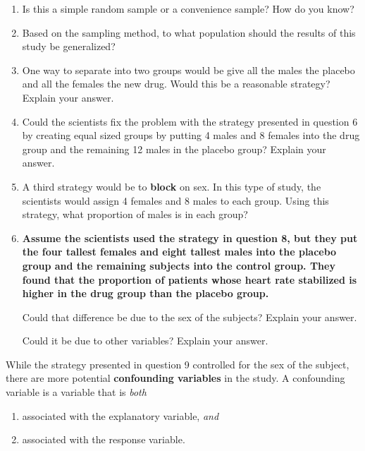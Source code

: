 \documentclass[
]{report}
\providecommand{\tightlist}{%
  \setlength{\itemsep}{0pt}\setlength{\parskip}{0pt}}
\begin{document}
\begin{enumerate}
\def\labelenumi{\arabic{enumi}.}
\setcounter{enumi}{3}
\item
  Is this a simple random sample or a convenience sample? How do you know?
  \vspace{0.5in}
\item
  Based on the sampling method, to what population should the results of this study be generalized?
  \vspace{0.5in}
\item
  One way to separate into two groups would be give all the males the placebo and all the females the new drug. Would this be a reasonable strategy? Explain your answer.
  \vspace{1in}
\item
  Could the scientists fix the problem with the strategy presented in question 6 by creating equal sized groups by putting 4 males and 8 females into the drug group and the remaining 12 males in the placebo group? Explain your answer.
  \vspace{0.5in}
\item
  A third strategy would be to \textbf{block} on sex. In this type of study, the scientists would assign 4 females and 8 males to each group. Using this strategy, what proportion of males is in each group?
  \vspace{0.3in}
\item
  \textbf{Assume the scientists used the strategy in question 8, but they put the four tallest females and eight tallest males into the placebo group and the remaining subjects into the control group. They found that the proportion of patients whose heart rate stabilized is higher in the drug group than the placebo group.}\\
  \vspace{0.1in}

  Could that difference be due to the sex of the subjects? Explain your answer.
  \vspace{0.5in}

  Could it be due to other variables? Explain your answer.
  \newpage
\end{enumerate}

While the strategy presented in question 9 controlled for the sex of the subject, there are more potential \textbf{confounding variables} in the study. A confounding variable is a variable that is \emph{both}

\begin{enumerate}
\def\labelenumi{\arabic{enumi}.}
\tightlist
\item
  associated with the explanatory variable, \emph{and}
\item
  associated with the response variable.
\end{enumerate}
\end{document}
